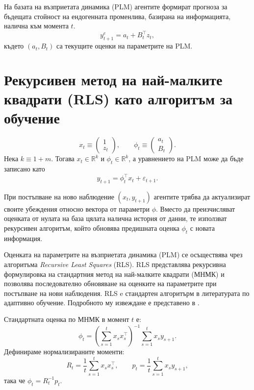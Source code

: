 На базата на възприетата динамика (PLM) агентите формират прогноза за бъдещата стойност на ендогенната променлива, базирана на информацията, налична към момента $t$.
\begin{equation}
y_{t+1}^e = a_{t} + B_{t}^\top z_{t},
\label{eq:plm_expectation}
\end{equation}
където $(a_{t}, B_{t})$ са текущите оценки на параметрите на PLM.

\section{Рекурсивен метод на най-малките квадрати  (RLS) като алгоритъм за обучение}

\begin{equation}
x_{t} \equiv
\begin{pmatrix}
1 \\
z_{t}
\end{pmatrix},
\qquad
\phi_t \equiv
\begin{pmatrix}
a_t \\
B_t
\end{pmatrix}.
\end{equation}
Нека $k \equiv 1+m$. Тогава $x_{t} \in \mathbb{R}^k$ и $\phi_t \in \mathbb{R}^k$, а уравнението на PLM може да бъде записано като
\begin{equation}
y_{t+1} = \phi_t^\top x_{t} + \varepsilon_{t+1}.
\end{equation}

При постъпване на ново наблюдение $(x_{t}, y_{t+1})$ агентите трябва да актуализират своите убеждения относно вектора от параметри $\phi$. Вместо да преизчисляват оценката от нулата на база цялата налична история от данни, те използват рекурсивен алгоритъм, който обновява предишната оценка ${\phi}_t$ с новата информация.

Оценката на параметрите на възприетата динамика (PLM) се осъществява чрез алгоритъма \emph{Recursive Least Squares} (RLS). RLS представлява рекурсивна формулировка на стандартния метод на най-малките квадрати (МНМК) и позволява последователно обновяване на оценките на параметрите при постъпване на нови наблюдения. RLS e стандартен алгоритърм в литературата по адаптивно обучение. Подробното му извеждане е представено в \textcite[с. 17-20]{ljung1983theory}.

Стандартната оценка по МНМК в момент $t$ е:
\begin{equation}
{\phi}_t = \left(\sum_{s=1}^{t} x_{s} x_{s}^\top\right)^{-1} \sum_{s=1}^{t} x_{s} y_{s+1}.
\end{equation}
Дефинираме нормализираните моменти:
\begin{equation}
R_t = \frac{1}{t}\sum_{s=1}^{t} x_{s} x_{s}^\top, \qquad
p_t = \frac{1}{t}\sum_{s=1}^{t} x_{s} y_{s+1},
\end{equation}
така че ${\phi}_t = R_t^{-1} p_t$.

